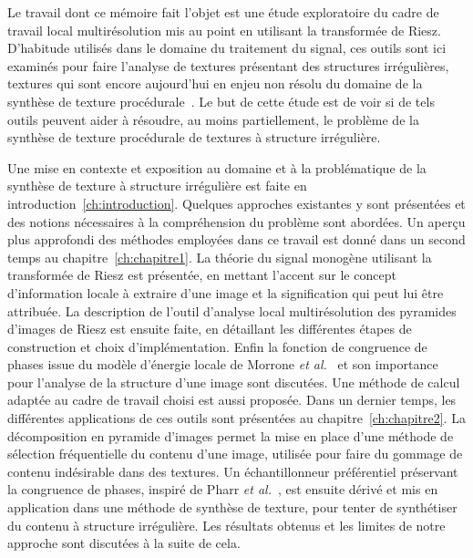 \Conclusion 
\label{ch:conclusion}


Le travail dont ce mémoire fait l'objet est une étude exploratoire du cadre de travail local multirésolution mis au point en utilisant la transformée de Riesz. D'habitude utilisés dans le domaine du traitement du signal, ces outils sont ici examinés pour faire l'analyse de textures présentant des structures irrégulières, textures qui sont encore aujourd'hui en enjeu non résolu du domaine de la synthèse de texture procédurale~\cite{guehl_semi-procedural_2020}. Le but de cette étude est de voir si de tels outils peuvent aider à résoudre, au moins partiellement, le problème de la synthèse de texture procédurale de textures à structure irrégulière.

\bigskip

Une mise en contexte et exposition au domaine et à la problématique de la synthèse de texture à structure irrégulière est faite en introduction~\ref{ch:introduction}. Quelques approches existantes y sont présentées et des notions nécessaires à la compréhension du problème sont abordées. Un aperçu plus approfondi des méthodes employées dans ce travail est donné dans un second temps au chapitre~\ref{ch:chapitre1}. La théorie du signal monogène utilisant la transformée de Riesz est présentée, en mettant l'accent sur le concept d'information locale à extraire d'une image et la signification qui peut lui être attribuée. La description de l'outil d'analyse local multirésolution des pyramides d'images de Riesz est ensuite faite, en détaillant les différentes étapes de construction et choix d'implémentation. Enfin la fonction de congruence de phases issue du modèle d'énergie locale de Morrone \textit{et al.}~\cite{morrone_feature_1987, morrone_mach_1986} et son importance pour l'analyse de la structure d'une image sont discutées. Une méthode de calcul adaptée au cadre de travail choisi est aussi proposée. Dans un dernier temps, les différentes applications de ces outils sont présentées au chapitre~\ref{ch:chapitre2}. La décomposition en pyramide d'images permet la mise en place d'une méthode de sélection fréquentielle du contenu d'une image, utilisée pour faire du gommage de contenu indésirable dans des textures. Un échantillonneur préférentiel préservant la congruence de phases, inspiré de Pharr \textit{et al.}~\cite{pharr_physically_2023}, est ensuite dérivé et mis en application dans une méthode de synthèse de texture, pour tenter de synthétiser du contenu à structure irrégulière. Les résultats obtenus et les limites de notre approche sont discutées à la suite de cela.

